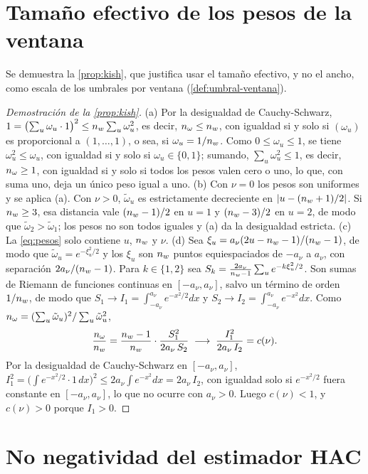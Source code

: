 \section{Tamaño efectivo de los pesos de la ventana}
\label{ap:dem-kish}

Se demuestra la \cref{prop:kish}, que justifica usar el tamaño efectivo, y no el ancho, como
escala de los umbrales por ventana (\cref{def:umbral-ventana}).

\begin{proof}[Demostración de la \cref{prop:kish}]
(a) Por la desigualdad de Cauchy-Schwarz,
$1=\bigl(\sum_u\omega_u\cdot1\bigr)^2\le n_{w}\sum_u\omega_u^2$, es decir, $n_{\omega}\le n_{w}$, con
igualdad si y solo si $(\omega_u)$ es proporcional a $(1,\dots,1)$, o sea, si $\omega_u=1/n_{w}$.
Como $0\le\omega_u\le1$, se tiene $\omega_u^2\le\omega_u$, con igualdad si y solo si
$\omega_u\in\{0, 1\}$; sumando, $\sum_u\omega_u^2\le1$, es decir, $n_{\omega}\ge1$, con igualdad si y
solo si todos los pesos valen cero o uno, lo que, con suma uno, deja un único peso igual a uno.
(b) Con $\nu=0$ los pesos son uniformes y se aplica (a). Con $\nu>0$, $\tilde\omega_u$ es
estrictamente decreciente en $\lvert u-(n_{w}+1)/2\rvert$. Si $n_{w}\ge3$, esa distancia vale $(n_{w}-1)/2$ en
$u=1$ y $(n_{w}-3)/2$ en $u=2$, de modo que $\tilde\omega_2>\tilde\omega_1$; los pesos no son todos
iguales y (a) da la desigualdad estricta. (c) La \cref{eq:pesos} solo contiene $u$, $n_{w}$ y $\nu$.
(d) Sea $\xi_u=a_\nu(2u-n_{w}-1)/(n_{w}-1)$, de modo que $\tilde\omega_u=e^{-\xi_u^2/2}$ y los $\xi_u$ son
$n_{w}$ puntos equiespaciados de $-a_\nu$ a $a_\nu$, con separación $2a_\nu/(n_{w}-1)$. Para $k\in\{1, 2\}$ sea
$S_k=\frac{2a_\nu}{n_{w}-1}\sum_u e^{-k\xi_u^2/2}$. Son sumas de Riemann de funciones continuas en
$[-a_\nu,a_\nu]$, salvo un término de orden $1/n_{w}$, de modo que $S_1\to I_1=\int_{-a_\nu}^{a_\nu}e^{-x^2/2}dx$ y
$S_2\to I_2=\int_{-a_\nu}^{a_\nu}e^{-x^2}dx$. Como $n_{\omega}=(\sum_u\tilde\omega_u)^2/\sum_u\tilde\omega_u^2$,
\[
  \frac{n_{\omega}}{n_{w}}=\frac{n_{w}-1}{n_{w}}\cdot\frac{S_1^2}{2a_\nu\,S_2}\;\longrightarrow\;
  \frac{I_1^2}{2a_\nu\,I_2}=c(\nu).
\]
Por la desigualdad de Cauchy-Schwarz en $[-a_\nu,a_\nu]$,
$I_1^2=\bigl(\int e^{-x^2/2}\cdot1\,dx\bigr)^2\le2a_\nu\int e^{-x^2}dx=2a_\nu\,I_2$, con igualdad solo si
$e^{-x^2/2}$ fuera constante en $[-a_\nu,a_\nu]$, lo que no ocurre con $a_\nu>0$. Luego $c(\nu)<1$, y
$c(\nu)>0$ porque $I_1>0$.
\end{proof}

\section{No negatividad del estimador HAC}
\label{ap:dem-hac}

